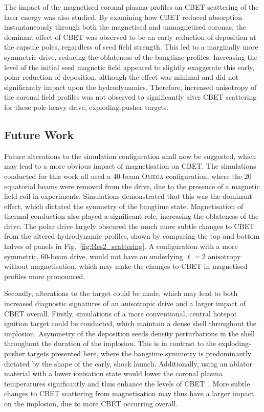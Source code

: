 The impact of the magnetised coronal plasma profiles on \ac{CBET} scattering of the laser energy was also studied.
By examining how \ac{CBET} reduced absorption instantaneously through both the magnetised and unmagnetised coronas, the dominant effect of \ac{CBET} was observed to be an early reduction of deposition at the capsule poles, regardless of seed field strength.
This led to a marginally more symmetric drive, reducing the oblateness of the bangtime profiles.
Increasing the level of the initial seed magnetic field appeared to slightly exaggerate this early, polar reduction of deposition, although the effect was minimal and did not significantly impact upon the hydrodynamics.
Therefore, increased anisotropy of the coronal field profiles was not observed to significantly alter \ac{CBET} scattering for these pole-heavy drive, exploding-pusher targets.

\subsection{Future Work}%
\label{sec:Res2_future}

Future alterations to the simulation configuration shall now be suggested, which may lead to a more obvious impact of magnetisation on \ac{CBET}.
The simulations conducted for this work all used a 40-beam \textsc{Omega} configuration, where the 20 equatorial beams were removed from the drive, due to the presence of a magnetic field coil in experiments.
Simulations demonstrated that this was the dominant effect, which dictated the symmetry of the bangtime state.
Magnetisation of thermal conduction also played a significant role, increasing the oblateness of the drive.
The polar drive largely obscured the much more subtle changes to \ac{CBET} from the altered hydrodynamic profiles, shown by comparing the top and bottom halves of panels in Fig.~\ref{fig:Res2_scattering}.
A configuration with a more symmetric, 60-beam drive, would not have an underlying $\ell=2$ anisotropy without magnetisation, which may make the changes to \ac{CBET} in magnetised profiles more pronounced.

Secondly, alterations to the target could be made, which may lead to both increased diagnostic signatures of an anisotropic drive and a larger impact of \ac{CBET} overall.
Firstly, simulations of a more conventional, central hotspot ignition target could be conducted, which maintain a dense shell throughout the implosion.
Asymmetry of the deposition seeds density perturbations in the shell throughout the duration of the implosion.
This is in contrast to the exploding-pusher targets presented here, where the bangtime symmetry is predominantly dictated by the shape of the early, shock launch.
Additionally, using an ablator material with a lower ionisation state would lower the coronal plasma temperatures significantly and thus enhance the levels of \ac{CBET}~\cite{colaitis_exploration_2023}.
More subtle changes to \ac{CBET} scattering from magnetisation may thus have a larger impact on the implosion, due to more \ac{CBET} occurring overall.
